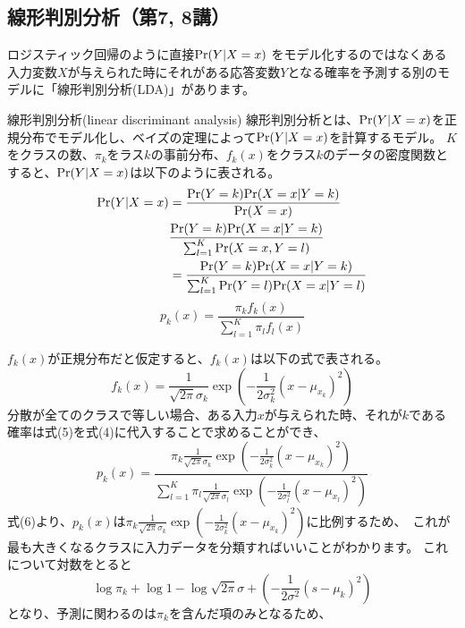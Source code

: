 \documentclass[uplatex]{jsarticle}
\begin{document}
\subsection{線形判別分析（第7, 8講）}
ロジスティック回帰のように直接${\rm Pr}(Y| X = x)$ をモデル化するのではなくある入力変数$X$が与えられた時にそれがある応答変数$Y$となる確率を予測する別のモデルに「線形判別分析(LDA)」があります。\
\begin{itembox}[l]{線形判別分析(linear discriminant analysis)}
  線形判別分析とは、${\rm Pr}(Y| X = x)$を正規分布でモデル化し、ベイズの定理によって${\rm Pr}(Y| X = x)$を計算するモデル。
  $K$をクラスの数、$\pi_k$をラス$k$の事前分布、$f_k(x)$をクラス$k$のデータの密度関数とすると、${\rm Pr}(Y| X = x)$は以下のように表される。
  \begin{equation}
    \begin{split}
      {\rm Pr}(Y| X = x) &= \frac{{\rm Pr}(Y = k){\rm Pr}(X = x| Y = k)}{{\rm Pr}(X = x)} \\
      &\frac{{\rm Pr}(Y = k){\rm Pr}(X = x| Y = k)}{\sum_{l=1}^K{\rm Pr}(X = x, Y = l)}\\
      &=\frac{{\rm Pr}(Y = k){\rm Pr}(X = x| Y = k)}{\sum_{l=1}^K{\rm Pr}(Y = l){\rm Pr}(X = x|Y = l)}\\
    \end{split}
  \end{equation}
    \begin{equation}
      p_k(x) = \frac{\pi_kf_k(x)}{\sum_{l=1}^K \pi_lf_l(x)}
    \end{equation}
\end{itembox}
$f_k(x)$が正規分布だと仮定すると、$f_k(x)$は以下の式で表される。
\begin{equation}
  f_k(x) = \frac{1}{\sqrt{2\pi}\sigma_k}\exp{\left(- \frac{1}{2\sigma_k^2}(x - \mu_{x_k})^2\right)}
\end{equation}
分散が全てのクラスで等しい場合、ある入力$x$が与えられた時、それが$k$である確率は式(5)を式(4)に代入することで求めることができ、\
\begin{equation}
        p_k(x) = \frac{\pi_k \frac{1}{\sqrt{2\pi}\sigma_k}\exp{\left(- \frac{1}{2\sigma_k^2}(x - \mu_{x_k})^2\right)}}{\sum_{l=1}^K \pi_l\frac{1}{\sqrt{2\pi}\sigma_l}\exp{\left(- \frac{1}{2\sigma_l^2}(x - \mu_{x_l})^2\right)}}
\end{equation}
式(6)より、$p_k(x)$は$\pi_k \frac{1}{\sqrt{2\pi}\sigma_k}\exp{\left(- \frac{1}{2\sigma_k^2}(x - \mu_{x_k})^2\right)}$に比例するため、\
これが最も大きくなるクラスに入力データを分類すればいいことがわかります。
これについて対数をとると
$$\log{\pi_k} + \log{1} - \log{\sqrt{2\pi}\sigma} + \left(-\frac{1}{2\sigma^2}(s - \mu_k)^2 \right)$$
となり、予測に関わるのは$\pi_k$を含んだ項のみとなるため、
\end{document}
